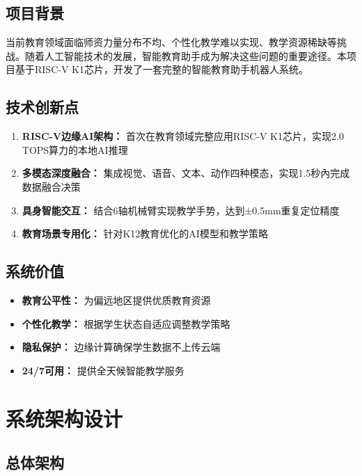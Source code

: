 \documentclass[12pt,a4paper]{article}
\begin{document}
\subsection{项目背景}

当前教育领域面临师资力量分布不均、个性化教学难以实现、教学资源稀缺等挑战。随着人工智能技术的发展，智能教育助手成为解决这些问题的重要途径。本项目基于RISC-V K1芯片，开发了一套完整的智能教育助手机器人系统。

\subsection{技术创新点}

\begin{enumerate}[leftmargin=2em]
    \item \textbf{RISC-V边缘AI架构：} 首次在教育领域完整应用RISC-V K1芯片，实现2.0 TOPS算力的本地AI推理
    \item \textbf{多模态深度融合：} 集成视觉、语音、文本、动作四种模态，实现1.5秒內完成数据融合决策
    \item \textbf{具身智能交互：} 结合6轴机械臂实现教学手势，达到±0.5mm重复定位精度
    \item \textbf{教育场景专用化：} 针对K12教育优化的AI模型和教学策略
\end{enumerate}

\subsection{系统价值}

\begin{itemize}[leftmargin=2em]
    \item \textbf{教育公平性：} 为偏远地区提供优质教育资源
    \item \textbf{个性化教学：} 根据学生状态自适应调整教学策略
    \item \textbf{隐私保护：} 边缘计算确保学生数据不上传云端
    \item \textbf{24/7可用：} 提供全天候智能教学服务
\end{itemize}

\newpage

\section{系统架构设计}

\subsection{总体架构}
\end{document}
